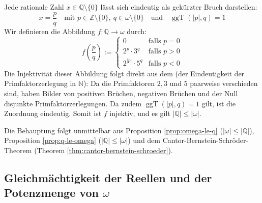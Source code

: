 \begin{math-stroke}
\begin{short-proof}
Jede rationale Zahl $x \in \mathbb{Q} \setminus \{0\}$ lässt sich eindeutig als gekürzter Bruch darstellen:
\[
x = \frac{p}{q} \quad \text{mit } p \in \mathbb{Z} \setminus \{0\}, \ q \in \omega \setminus \{0\} \quad \text{und} \quad \operatorname{ggT}(|p|, q) = 1
\]
Wir definieren die Abbildung $f \colon \mathbb{Q} \to \omega$ durch:
\begin{equation}\label{eq:prime-injection}
f\left(\frac{p}{q}\right) := \begin{cases}
0 & \text{falls } p = 0 \\
2^p \cdot 3^q & \text{falls } p > 0 \\
2^{|p|} \cdot 5^q & \text{falls } p < 0
\end{cases}
\end{equation}
Die Injektivität dieser Abbildung folgt direkt aus dem  (der Eindeutigkeit der Primfaktorzerlegung in $\mathbb{N}$):
Da die Primfaktoren $2, 3$ und $5$ paarweise verschieden sind, haben Bilder von positiven Brüchen, negativen Brüchen und der Null disjunkte Primfaktorzerlegungen. Da zudem $\operatorname{ggT}(|p|, q) = 1$ gilt, ist die Zuordnung eindeutig. Somit ist $f$ injektiv, und es gilt $|\mathbb{Q}| \le |\omega|$.
\end{short-proof}

\begin{short-proof}
Die Behauptung folgt unmittelbar aus Proposition \ref{prop:omega-le-q} ($|\omega| \le |\mathbb{Q}|$), Proposition \ref{prop:q-le-omega} ($|\mathbb{Q}| \le |\omega|$) und dem Cantor-Bernstein-Schröder-Theorem (Theorem \ref{thm:cantor-bernstein-schroeder}).
\end{short-proof}
\end{math-stroke}

\subsection{Gleichmächtigkeit der Reellen und der Potenzmenge von \texorpdfstring{$\omega$}{omega}}

